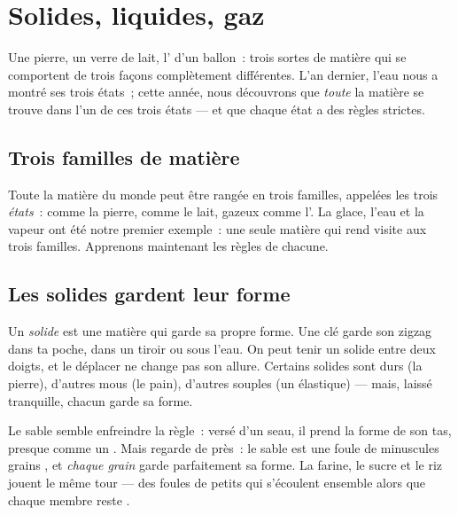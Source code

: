 \chapter{Solides, liquides, gaz}\label{ch:g3:solids-liquids-gases}

Une pierre, un verre de lait, l' d'un ballon~: trois sortes de
matière qui se comportent de trois façons complètement différentes.
L'an dernier, l'eau nous a montré ses trois états~; cette année, nous
découvrons que \emph{toute} la matière se trouve dans l'un de ces
trois états --- et que chaque état a des règles strictes.

\section{Trois familles de matière}

Toute la matière du monde peut être rangée en trois familles,
appelées les trois \emph{états}~:  comme la pierre, 
comme le lait, gazeux comme l'. La glace, l'eau et la vapeur ont
été notre premier exemple~: une seule matière qui rend visite aux
trois familles. Apprenons maintenant les règles de chacune.

\section{Les solides gardent leur forme}

\begin{definition}[Solide]\label{def:g3:solids-liquids-gases:solid}
Un \emph{solide} est une matière qui garde sa propre
forme. Une clé garde son zigzag dans ta poche, dans un tiroir ou sous
l'eau. On peut tenir un solide entre deux doigts, et le déplacer ne
change pas son allure. Certains solides sont durs (la pierre),
d'autres mous (le pain), d'autres souples (un élastique) --- mais,
laissé tranquille, chacun garde sa forme.
\end{definition}

\begin{example}\label{ex:g3:solids-liquids-gases:sand}
Le sable semble enfreindre la règle~: versé d'un seau, il prend la
forme de son tas, presque comme un . Mais regarde de près~: le
sable est une foule de minuscules grains , et \emph{chaque
grain} garde parfaitement sa forme. La farine, le sucre et le riz
jouent le même tour --- des foules de petits  qui s'écoulent
ensemble alors que chaque membre reste .
\end{example}

